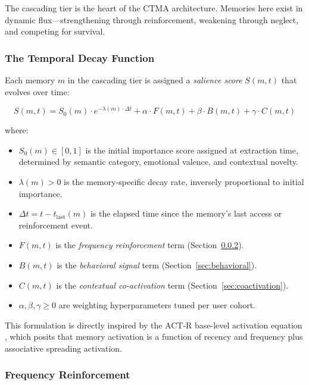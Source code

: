 \documentclass[11pt,a4paper]{article}
\begin{document}
The cascading tier is the heart of the CTMA architecture. Memories here exist in dynamic flux---strengthening through reinforcement, weakening through neglect, and competing for survival.

\subsubsection{The Temporal Decay Function}

Each memory $m$ in the cascading tier is assigned a \textit{salience score} $S(m, t)$ that evolves over time:

\begin{equation}
\boxed{
S(m, t) = S_0(m) \cdot e^{-\lambda(m) \cdot \Delta t} + \alpha \cdot F(m, t) + \beta \cdot B(m, t) + \gamma \cdot C(m, t)
}
\label{eq:salience}
\end{equation}

\noindent where:
\begin{itemize}[leftmargin=2em]
  \item $S_0(m) \in [0, 1]$ is the initial importance score assigned at extraction time, determined by semantic category, emotional valence, and contextual novelty.
  \item $\lambda(m) > 0$ is the memory-specific decay rate, inversely proportional to initial importance.
  \item $\Delta t = t - t_{\text{last}}(m)$ is the elapsed time since the memory's last access or reinforcement event.
  \item $F(m, t)$ is the \textit{frequency reinforcement} term (Section~\ref{sec:frequency}).
  \item $B(m, t)$ is the \textit{behavioral signal} term (Section~\ref{sec:behavioral}).
  \item $C(m, t)$ is the \textit{contextual co-activation} term (Section~\ref{sec:coactivation}).
  \item $\alpha, \beta, \gamma \geq 0$ are weighting hyperparameters tuned per user cohort.
\end{itemize}

This formulation is directly inspired by the ACT-R base-level activation equation \citep{anderson2004integrated}, which posits that memory activation is a function of recency and frequency plus associative spreading activation.

\subsubsection{Frequency Reinforcement}
\label{sec:frequency}
\end{document}
